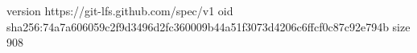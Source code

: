 version https://git-lfs.github.com/spec/v1
oid sha256:74a7a606059c2f9d3496d2fc360009b44a51f3073d4206c6ffcf0c87c92e794b
size 908
